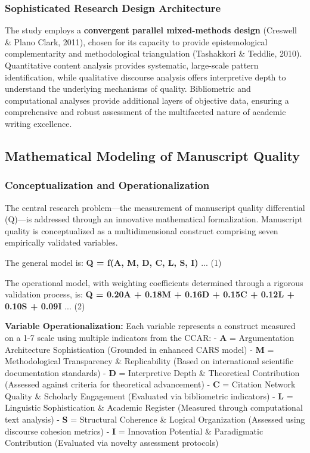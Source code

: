 \documentclass[journal,article,submit,pdftex,moreauthors]{Definitions/mdpi}
\begin{document}
\subsubsection{Sophisticated Research Design Architecture}

The study employs a \textbf{convergent parallel mixed-methods design} (Creswell \& Plano Clark, 2011), chosen for its capacity to provide epistemological complementarity and methodological triangulation (Tashakkori \& Teddlie, 2010). Quantitative content analysis provides systematic, large-scale pattern identification, while qualitative discourse analysis offers interpretive depth to understand the underlying mechanisms of quality. Bibliometric and computational analyses provide additional layers of objective data, ensuring a comprehensive and robust assessment of the multifaceted nature of academic writing excellence.

\subsection{Mathematical Modeling of Manuscript Quality}

\subsubsection{Conceptualization and Operationalization}

The central research problem—the measurement of manuscript quality differential (Q)—is addressed through an innovative mathematical formalization. Manuscript quality is conceptualized as a multidimensional construct comprising seven empirically validated variables.

The general model is:
\textbf{Q = f(A, M, D, C, L, S, I)} ... (1)

The operational model, with weighting coefficients determined through a rigorous validation process, is:
\textbf{Q = 0.20A + 0.18M + 0.16D + 0.15C + 0.12L + 0.10S + 0.09I} ... (2)

\textbf{Variable Operationalization:} Each variable represents a construct measured on a 1-7 scale using multiple indicators from the CCAR:
- \textbf{A} = Argumentation Architecture Sophistication (Grounded in enhanced CARS model)
- \textbf{M} = Methodological Transparency \& Replicability (Based on international scientific documentation standards)
- \textbf{D} = Interpretive Depth \& Theoretical Contribution (Assessed against criteria for theoretical advancement)
- \textbf{C} = Citation Network Quality \& Scholarly Engagement (Evaluated via bibliometric indicators)
- \textbf{L} = Linguistic Sophistication \& Academic Register (Measured through computational text analysis)
- \textbf{S} = Structural Coherence \& Logical Organization (Assessed using discourse cohesion metrics)
- \textbf{I} = Innovation Potential \& Paradigmatic Contribution (Evaluated via novelty assessment protocols)
\end{document}
